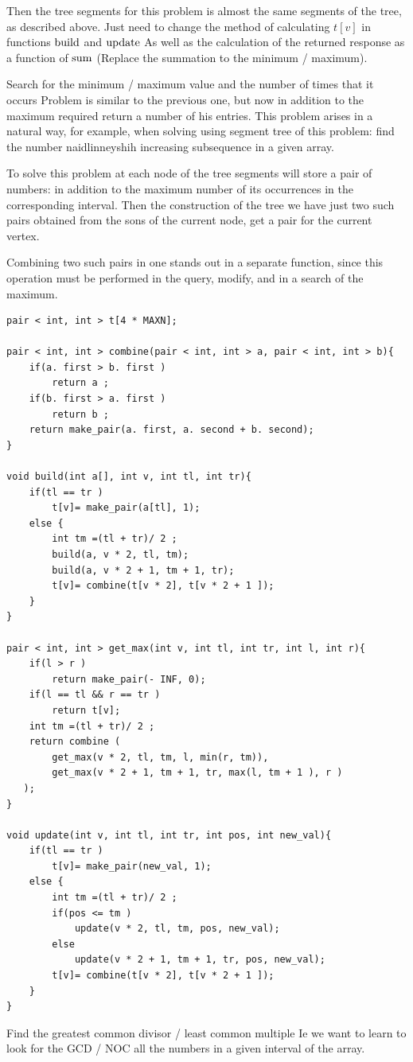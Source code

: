 Then the tree segments for this problem is almost the same segments of the tree, as described above. Just need to change the method of calculating $t [v]$ in functions $\rm build$ and $\rm update$ As well as the calculation of the returned response as a function of $\rm sum$ (Replace the summation to the minimum / maximum).

Search for the minimum / maximum value and the number of times that it occurs
Problem is similar to the previous one, but now in addition to the maximum required return a number of his entries. This problem arises in a natural way, for example, when solving using segment tree of this problem: find the number naidlinneyshih increasing subsequence in a given array.

To solve this problem at each node of the tree segments will store a pair of numbers: in addition to the maximum number of its occurrences in the corresponding interval. Then the construction of the tree we have just two such pairs obtained from the sons of the current node, get a pair for the current vertex.

Combining two such pairs in one stands out in a separate function, since this operation must be performed in the query, modify, and in a search of the maximum.

\begin{verbatim}
pair < int, int > t[4 * MAXN];
 
pair < int, int > combine(pair < int, int > a, pair < int, int > b){
    if(a. first > b. first )
        return a ;
    if(b. first > a. first )
        return b ;
    return make_pair(a. first, a. second + b. second);
}
 
void build(int a[], int v, int tl, int tr){
    if(tl == tr )
        t[v]= make_pair(a[tl], 1);
    else {
        int tm =(tl + tr)/ 2 ;
        build(a, v * 2, tl, tm);
        build(a, v * 2 + 1, tm + 1, tr);
        t[v]= combine(t[v * 2], t[v * 2 + 1 ]);
    }
}
 
pair < int, int > get_max(int v, int tl, int tr, int l, int r){
    if(l > r )
        return make_pair(- INF, 0);
    if(l == tl && r == tr )
        return t[v];
    int tm =(tl + tr)/ 2 ;
    return combine (
        get_max(v * 2, tl, tm, l, min(r, tm)),
        get_max(v * 2 + 1, tm + 1, tr, max(l, tm + 1 ), r )
   );
}
 
void update(int v, int tl, int tr, int pos, int new_val){
    if(tl == tr )
        t[v]= make_pair(new_val, 1);
    else {
        int tm =(tl + tr)/ 2 ;
        if(pos <= tm )
            update(v * 2, tl, tm, pos, new_val);
        else
            update(v * 2 + 1, tm + 1, tr, pos, new_val);
        t[v]= combine(t[v * 2], t[v * 2 + 1 ]);
    }
} 
\end{verbatim}
Find the greatest common divisor / least common multiple
Ie we want to learn to look for the GCD / NOC all the numbers in a given interval of the array.

